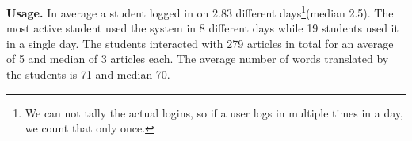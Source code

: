 {\bf Usage.}
In average a student logged in on 2.83 different days\footnote{We can not tally the actual logins, so if a user logs in multiple times in a day, we count that only once.}(median 2.5). The most active student used the system in 8 different days while 19 students used it in a single day. The students interacted with 279 articles in total for an average of 5 and median of 3 articles each. The average number of words translated by the students is 71 and median 70. 












